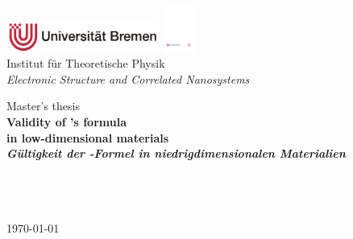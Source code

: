 

\begin{titlepage}
    \centering

    \normalsize
    \includegraphics[width=5cm]{figures/uni.pdf} \hfill
    \includegraphics[height=1.5cm]{figures/itp.pdf} \\
    \hfill Institut für Theoretische Physik \\
    \hfill \emph{Electronic Structure and Correlated Nanosystems}

    \vfill

    \Large
    Master's thesis \\[3pc]

    \Huge \bf
    Validity of 's formula \\
    in low-dimensional materials \\[3pc]

    \normalsize \it
    Gültigkeit der -Formel
    in niedrigdimensionalen Materialien

    \vfill

    \large \normalfont
     \\[1pc]
     \\
     \\[2pc]

    \today

    \vfill
\end{titlepage}

\restoregeometry
